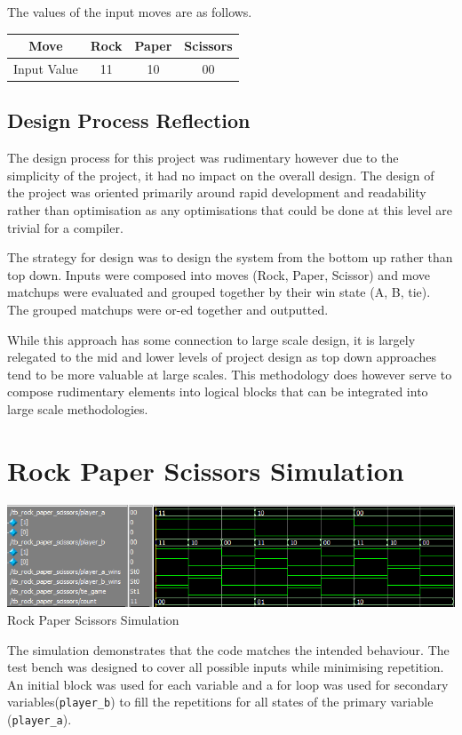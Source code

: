 \documentclass[12pt,letterpaper,titlepage]{article}
\begin{document}
\begin{raggedright}
The values of the input moves are as follows.
\begin{center}
\begin{tabular}{|c|c|c|c|}
\hline 
Move & Rock & Paper & Scissors \\ 
\hline 
Input Value & 11 & 10 & 00 \\ 
\hline 
\end{tabular} 
\end{center}

\subsection*{Design Process Reflection}

The design process for this project was rudimentary however due to the simplicity of the project, it had no impact on the overall design. The design of the project was oriented primarily around rapid development and readability rather than optimisation as any optimisations that could be done at this level are trivial for a compiler.

The strategy for design was to design the system from the bottom up rather than top down. Inputs were composed into moves (Rock, Paper, Scissor) and move matchups were evaluated and grouped together by their win state (A, B, tie). The grouped matchups were or-ed together and outputted.

While this approach has some connection to large scale design, it is largely relegated to the mid and lower levels of project design as top down approaches tend to be more valuable at large scales. This methodology does however serve to compose rudimentary elements into logical blocks that can be integrated into large scale methodologies.

\clearpage
\section{Rock Paper Scissors Simulation}
\begin{center}
\includegraphics[width=\textwidth]{tb_rps}
Rock Paper Scissors Simulation
\end{center}

The simulation demonstrates that the code matches the intended behaviour. The test bench was designed to cover all possible inputs while minimising repetition. An initial block was used for each variable and a for loop was used for secondary variables(\texttt{player\_b}) to fill the repetitions for all states of the primary variable (\texttt{player\_a}).


\end{raggedright}
\end{document}
